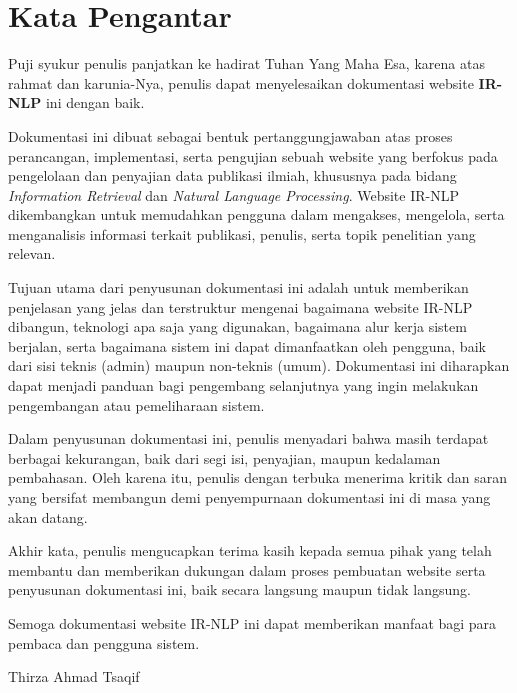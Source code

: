 \chapter*{Kata Pengantar}

Puji syukur penulis panjatkan ke hadirat Tuhan Yang Maha Esa, karena atas rahmat dan karunia-Nya, penulis dapat menyelesaikan dokumentasi website \textbf{IR-NLP} ini dengan baik.

Dokumentasi ini dibuat sebagai bentuk pertanggungjawaban atas proses perancangan, implementasi, serta pengujian sebuah website yang berfokus pada pengelolaan dan penyajian data publikasi ilmiah, khususnya pada bidang \textit{Information Retrieval} dan \textit{Natural Language Processing}. Website IR-NLP dikembangkan untuk memudahkan pengguna dalam mengakses, mengelola, serta menganalisis informasi terkait publikasi, penulis, serta topik penelitian yang relevan.

Tujuan utama dari penyusunan dokumentasi ini adalah untuk memberikan penjelasan yang jelas dan terstruktur mengenai bagaimana website IR-NLP dibangun, teknologi apa saja yang digunakan, bagaimana alur kerja sistem berjalan, serta bagaimana sistem ini dapat dimanfaatkan oleh pengguna, baik dari sisi teknis (admin) maupun non-teknis (umum). Dokumentasi ini diharapkan dapat menjadi panduan bagi pengembang selanjutnya yang ingin melakukan pengembangan atau pemeliharaan sistem.

Dalam penyusunan dokumentasi ini, penulis menyadari bahwa masih terdapat berbagai kekurangan, baik dari segi isi, penyajian, maupun kedalaman pembahasan. Oleh karena itu, penulis dengan terbuka menerima kritik dan saran yang bersifat membangun demi penyempurnaan dokumentasi ini di masa yang akan datang.

Akhir kata, penulis mengucapkan terima kasih kepada semua pihak yang telah membantu dan memberikan dukungan dalam proses pembuatan website serta penyusunan dokumentasi ini, baik secara langsung maupun tidak langsung.

Semoga dokumentasi website IR-NLP ini dapat memberikan manfaat bagi para pembaca dan pengguna sistem.

\vspace*{1cm}
\begin{flushright}
Thirza Ahmad Tsaqif
\end{flushright}

